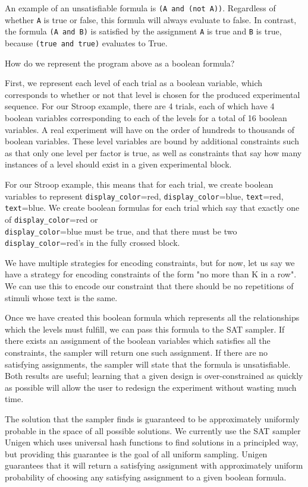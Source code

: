An example of an unsatisfiable formula is \texttt{(A and (not A))}. Regardless of whether \texttt{A} is true or false, this formula will always evaluate to false. In contrast, the formula \texttt{(A and B)} is satisfied by the assignment \texttt{A} is true and \texttt{B} is true, because \texttt{(true and true)} evaluates to True.

How do we represent the program above as a boolean formula?

First, we represent each level of each trial as a boolean variable, which corresponds to whether or not that level is chosen for the produced experimental sequence. For our Stroop example, there are 4 trials, each of which have 4 boolean variables corresponding to each of the levels for a total of 16 boolean variables. A real experiment will have on the order of hundreds to thousands of boolean variables. These level variables are bound by additional constraints such as that only one level per factor is true, as well as constraints that say how many instances of a level should exist in a given experimental block.

For our Stroop example, this means that for each trial, we create boolean variables to represent \texttt{display\_color}=red, \texttt{display\_color}=blue, \texttt{text}=red, \texttt{text}=blue. We create boolean formulas for each trial which say that exactly one of \texttt{display\_color}=red or\\ \texttt{display\_color}=blue must be true, and that there must be two \texttt{display\_color}=red's in the fully crossed block.

We have multiple strategies for encoding constraints, but for now, let us say we have a strategy for encoding constraints of the form "no more than K in a row". We can use this to encode our constraint that there should be no repetitions of stimuli whose text is the same.

Once we have created this boolean formula which represents all the relationships which the levels must fulfill, we can pass this formula to the SAT sampler. If there exists an assignment of the boolean variables which satisfies all the constraints, the sampler will return one such assignment. If there are no satisfying assignments, the sampler will state that the formula is unsatisfiable. Both results are useful; learning that a given design is over-constrained as quickly as possible will allow the user to redesign the experiment without wasting much time.

The solution that the sampler finds is guaranteed to be approximately uniformly probable in the space of all possible solutions. We currently use the SAT sampler Unigen which uses universal hash functions to find solutions in a principled way, but providing this guarantee is the goal of all uniform sampling. Unigen guarantees that it will return a satisfying assignment with approximately uniform probability of choosing any satisfying assignment to a given boolean formula.

